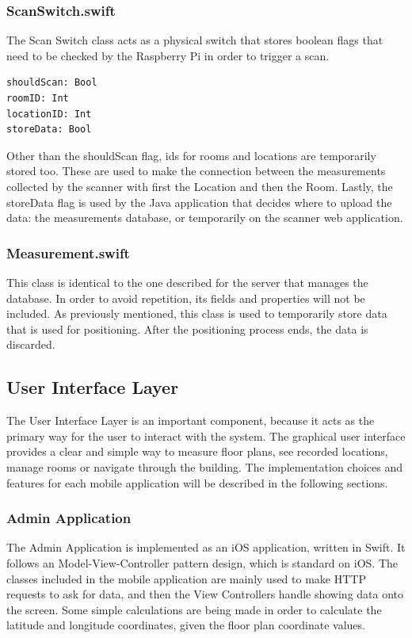 \subsubsection*{ScanSwitch.swift}

The Scan Switch class acts as a physical switch that stores boolean flags that need to be checked by the Raspberry Pi in order to trigger a scan. 

\begin{lstlisting}
shouldScan: Bool
roomID: Int
locationID: Int
storeData: Bool
\end{lstlisting}

\noindent
Other than the shouldScan flag, ids for rooms and locations are temporarily stored too. These are used to make the connection between the measurements collected by the scanner with first the Location and then the Room. Lastly, the storeData flag is used by the Java application that decides where to upload the data: the measurements database, or temporarily on the scanner web application.

\subsubsection*{Measurement.swift}
This class is identical to the one described for the server that manages the database. In order to avoid repetition, its fields and properties will not be included. As previously mentioned, this class is used to temporarily store data that is used for positioning. After the positioning process ends, the data is discarded.

\subsection{User Interface Layer}
The User Interface Layer is an important component, because it acts as the primary way for the user to interact with the system. The graphical user interface provides a clear and simple way to measure floor plans, see recorded locations, manage rooms or navigate through the building. The implementation choices and features for each mobile application will be described in the following sections.

\subsubsection{Admin Application}
The Admin Application is implemented as an iOS application, written in Swift. It follows an Model-View-Controller pattern design, which is standard on iOS. The classes included in the mobile application are mainly used to make HTTP requests to ask for data, and then the View Controllers handle showing data onto the screen. Some simple calculations are being made in order to calculate the latitude and longitude coordinates, given the floor plan coordinate values.

